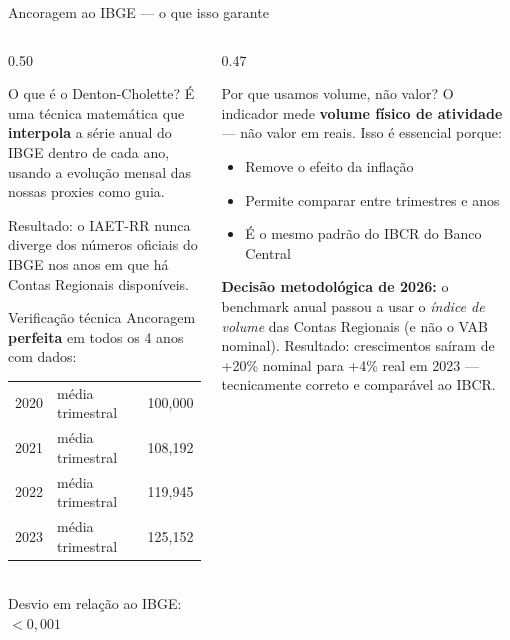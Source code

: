 \documentclass[aspectratio=169, 11pt]{beamer}
\begin{document}
\begin{frame}{Ancoragem ao IBGE — o que isso garante}

  \begin{columns}[T]
    \begin{column}{0.50\textwidth}
      \begin{block}{O que é o Denton-Cholette?}
        É uma técnica matemática que \textbf{interpola} a série anual do IBGE
        dentro de cada ano, usando a evolução mensal das nossas proxies como guia.

        \vspace{0.3cm}
        Resultado: o IAET-RR nunca diverge dos números oficiais do IBGE nos anos
        em que há Contas Regionais disponíveis.
      \end{block}

      \vspace{0.3cm}

      \begin{exampleblock}{Verificação técnica}
        Ancoragem \textbf{perfeita} em todos os 4 anos com dados:\\
        \begin{tabular}{llr}
          2020 & média trimestral & 100,000 \\
          2021 & média trimestral & 108,192 \\
          2022 & média trimestral & 119,945 \\
          2023 & média trimestral & 125,152 \\
        \end{tabular}\\
        Desvio em relação ao IBGE: $< 0{,}001$
      \end{exampleblock}
    \end{column}

    \begin{column}{0.47\textwidth}
      \begin{alertblock}{Por que usamos volume, não valor?}
        O indicador mede \textbf{volume físico de atividade} — não valor em
        reais. Isso é essencial porque:

        \begin{itemize}
          \item Remove o efeito da inflação
          \item Permite comparar entre trimestres e anos
          \item É o mesmo padrão do IBCR do Banco Central
        \end{itemize}

        \vspace{0.3cm}
        \textbf{Decisão metodológica de 2026:} o benchmark anual passou a usar
        o \textit{índice de volume} das Contas Regionais (e não o VAB nominal).
        Resultado: crescimentos saíram de +20\% nominal para +4\% real em 2023
        — tecnicamente correto e comparável ao IBCR.
      \end{alertblock}
    \end{column}
  \end{columns}

\end{frame}
\end{document}
